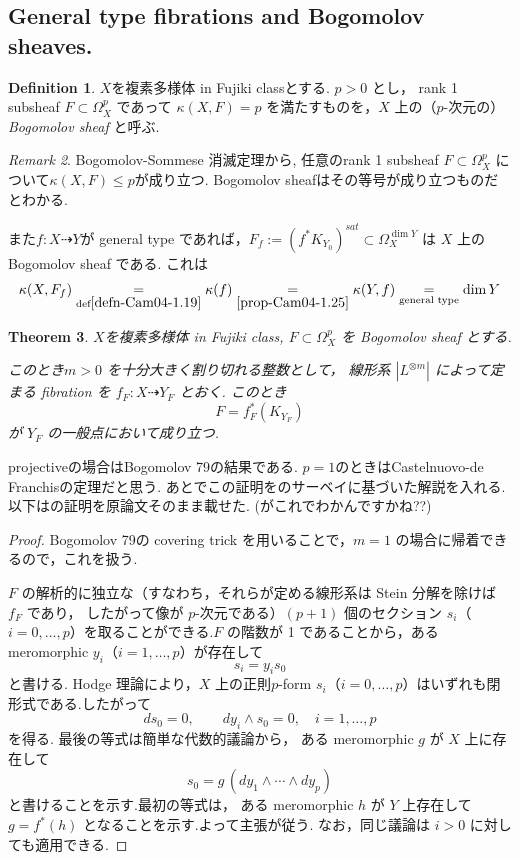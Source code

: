 \documentclass[dvipdfmx,a4paper,11pt]{article} %
\newtheorem{thm}{Theorem}[section]
\theoremstyle{definition}
\newtheorem{defn}[thm]{Definition}
\theoremstyle{remark}
\newtheorem{rem}[thm]{Remark}
\numberwithin{equation}{section}
\begin{document}
\subsection{General type fibrations and Bogomolov sheaves. \cite[2.6]{Cam04}}

\begin{defn}\cite[Definition 2.24]{Cam04}
$X$を複素多様体 in Fujiki classとする. 
\(p>0\) とし， rank 1 subsheaf \(F \subset \Omega_X^p\) であって \(\kappa(X,F)=p\) を満たすものを，\(X\) 上の（\(p\)-次元の）\emph{Bogomolov sheaf} と呼ぶ.
\end{defn}

\begin{rem}
Bogomolov-Sommese 消滅定理から, 
任意のrank 1 subsheaf \(F \subset \Omega_X^p\) について$\kappa(X, F) \le p$が成り立つ.
Bogomolov sheafはその等号が成り立つものだとわかる. 

また\(f : X\dashrightarrow Y\)が general type であれば，\(F_f:= (f^{*}K_{Y_0})^{sat} \subset \Omega_{X}^{\dim Y}\) は \(X\) 上の Bogomolov sheaf である. 
これは
$$
\kappa(X, F_f)
\underset{\text{def} \ref{defn-Cam04-1.19}}{=}
\kappa(f)
\underset{\ref{prop-Cam04-1.25}}{=}
\kappa(Y, f)
\underset{\text{general type}}{=}\dim Y
$$
\end{rem}

\begin{thm}\cite[Theorem 2.25]{Cam04}
\label{thm-Cam04-2.25}
$X$を複素多様体 in Fujiki class, 
\(F \subset \Omega_X^p\) を Bogomolov sheaf とする. 

このとき\(m>0\) を十分大きく割り切れる整数として， 線形系 \(|L^{\otimes m}|\) によって定まる fibration を \(f_F : X \dashrightarrow Y_F\) とおく. %
このとき
\[
F = f_F^*(K_{Y_F})
\]
が \(Y_F\) の一般点において成り立つ.
\end{thm}


projectiveの場合はBogomolov 79の結果である. 
$p=1$のときはCastelnuovo-de Franchisの定理だと思う. あとでこの証明を\cite{Voi}のサーベイに基づいた解説を入れる. 以下は\cite{Cam04}の証明を原論文そのまま載せた. (がこれでわかんですかね??)

\begin{proof}
Bogomolov 79の covering trick を用いることで，\(m=1\) の場合に帰着できるので，これを扱う.

\(F\) の解析的に独立な（すなわち，それらが定める線形系は Stein 分解を除けば \(f_F\) であり， したがって像が \(p\)-次元である）\((p+1)\) 個のセクション \(s_i\)（\(i=0,\dots,p\)）を取ることができる.\(F\) の階数が 1 であることから，ある meromorphic \(y_i\)（\(i=1,\dots,p\)）が存在して
\[
s_i = y_i s_0
\]
と書ける.
Hodge 理論により，\(X\) 上の正則\(p\)-form \(s_i\)（\(i=0,\dots,p\)）はいずれも閉形式である.したがって
\[
ds_0 = 0,\qquad dy_i \wedge s_0 = 0,\quad i=1,\dots,p
\]
を得る.
最後の等式は簡単な代数的議論から， ある meromorphic \(g\) が \(X\) 上に存在して
\[
s_0 = g\,(dy_1\wedge \cdots \wedge dy_p)
\]
と書けることを示す.最初の等式は， ある meromorphic  \(h\) が \(Y\) 上存在して \(g = f^*(h)\) となることを示す.よって主張が従う. なお，同じ議論は \(i>0\) に対しても適用できる.
\end{proof}
\end{document}
